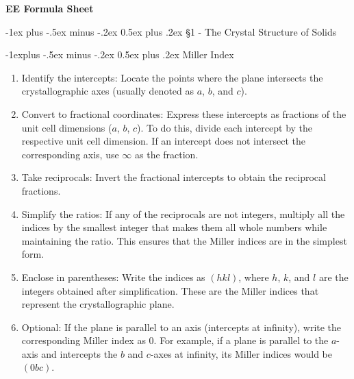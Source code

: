 \documentclass[10pt,landscape]{article}
\makeatletter
\renewcommand{\section}{\@startsection{section}{1}{0mm}%
                                {-1ex plus -.5ex minus -.2ex}%
                                {0.5ex plus .2ex}%
                                {\normalfont\large\bfseries}}
\renewcommand{\subsection}{\@startsection{subsection}{2}{0mm}%
                                {-1explus -.5ex minus -.2ex}%
                                {0.5ex plus .2ex}%
                                {\normalfont\normalsize\bfseries}}
\makeatother
\begin{document}
\raggedright
\footnotesize
\begin{multicols}{3}


\setlength{\premulticols}{1pt}
\setlength{\postmulticols}{1pt}
\setlength{\multicolsep}{1pt}
\setlength{\columnsep}{2pt}

\begin{center}
     \Large{\textbf{EE Formula Sheet}} \\
\end{center}

\newlength{\MyLen}



\section{\S1 - The Crystal Structure of Solids}

\subsection{Miller Index}

\begin{enumerate}
	\item Identify the intercepts: Locate the points where the plane intersects the crystallographic axes (usually denoted as $a$, $b$, and $c$).
	\item Convert to fractional coordinates: Express these intercepts as fractions of the unit cell dimensions ($a$, $b$, $c$). To do this, divide each intercept by the respective unit cell dimension. If an intercept does not intersect the corresponding axis, use $\infty$ as the fraction.
	\item Take reciprocals: Invert the fractional intercepts to obtain the reciprocal fractions.
	\item Simplify the ratios: If any of the reciprocals are not integers, multiply all the indices by the smallest integer that makes them all whole numbers while maintaining the ratio. This ensures that the Miller indices are in the simplest form.
	\item Enclose in parentheses: Write the indices as $(hkl)$, where $h$, $k$, and $l$ are the integers obtained after simplification. These are the Miller indices that represent the crystallographic plane.
	\item Optional: If the plane is parallel to an axis (intercepts at infinity), write the corresponding Miller index as 0. For example, if a plane is parallel to the $a$-axis and intercepts the $b$ and $c$-axes at infinity, its Miller indices would be $(0bc)$.
\end{enumerate}


\end{multicols}
\end{document}
